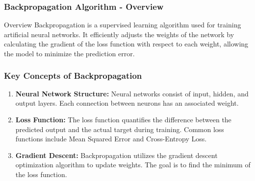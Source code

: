 \documentclass[aspectratio=169]{beamer}
\begin{document}
\begin{frame}[fragile]
    \frametitle{Backpropagation Algorithm - Overview}
    \begin{block}{Overview}
        Backpropagation is a supervised learning algorithm used for training artificial neural networks. 
        It efficiently adjusts the weights of the network by calculating the gradient of the loss function 
        with respect to each weight, allowing the model to minimize the prediction error.
    \end{block}
\end{frame}

\begin{frame}[fragile]
    \frametitle{Key Concepts of Backpropagation}
    \begin{enumerate}
        \item \textbf{Neural Network Structure:} 
            Neural networks consist of input, hidden, and output layers. Each connection between neurons has an associated weight.
            
        \item \textbf{Loss Function:} 
            The loss function quantifies the difference between the predicted output and the actual target during training. 
            Common loss functions include Mean Squared Error and Cross-Entropy Loss.

        \item \textbf{Gradient Descent:} 
            Backpropagation utilizes the gradient descent optimization algorithm to update weights. 
            The goal is to find the minimum of the loss function.
    \end{enumerate}
\end{frame}
\end{document}
